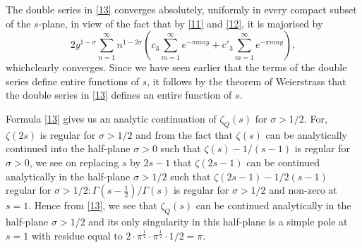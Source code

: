 The double series in \eqref{13} converges absolutely, uniformly in
every compact subset of the $s$-plane, in view of the fact that by
\eqref{11} and \eqref{12}, it is majorised by
$$
2y^{1-\sigma}\sum^{\infty}_{n=1}n^{1-2\sigma}\left(c_{3}\sum^{\infty}_{m=1}e^{-\pi
  mny}+c'_{3}\sum^{\infty}_{m=1}e^{-\pi mny}\right), 
$$
which\pageoriginale clearly converges. Since we have seen earlier that
the terms of the double series define entire functions of $s$, it
follows by the theorem of Weierstrass that the double series in
\eqref{13} defines an entire function of $s$.

Formula \eqref{13} gives us an analytic continuation of $\zeta_{Q}(s)$
for $\sigma>1/2$. For, $\zeta(2s)$ is regular for $\sigma>1/2$ and
from the fact that $\zeta(s)$ can be analytically continued into the
half-plane $\sigma>0$ such that $\zeta(s)-1/(s-1)$ is regular for
$\sigma>0$, we see on replacing $s$ by $2s-1$ that $\zeta(2s-1)$ can
be continued analytically in the half-plane $\sigma>1/2$ such that
$\zeta(2s-1)-1/2(s-1)$ regular for
$\sigma>1/2:\Gamma(s-\frac{1}{2})/\Gamma(s)$ is regular for
$\sigma>1/2$ and non-zero at $s=1$. Hence from \eqref{13}, we see that
$\zeta_{Q}(s)$ can be continued analytically in the half-plane
$\sigma>1/2$ and its only singularity in this half-plane is a simple
pole at $s=1$ with residue equal to $2\cdot \pi^{\frac{1}{2}}\cdot
\pi^{\frac{1}{2}}\cdot 1/2=\pi$. 

